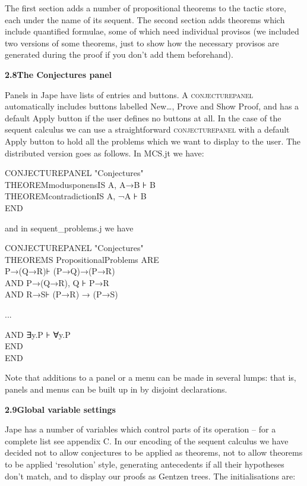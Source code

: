 \documentclass[11pt]{book}
\newcommand{\tab}{\hspace{5mm}}
\begin{document}
The first section adds a number of propositional theorems to the tactic store, each under the name of its sequent. The second section adds theorems which include quantified formulae, some of which need individual provisos (we included two versions of some theorems, just to show how the necessary provisos are generated during the proof if you don't add them beforehand).


\textbf{{\large 2.8\tab The Conjectures panel}}


Panels in Jape have lists of entries and buttons. A \textsc{conjecturepanel} automatically includes buttons labelled New\dots, Prove and Show Proof, and has a default Apply button if the user defines no buttons at all. In the case of the sequent calculus we can use a straightforward \textsc{conjecturepanel} with a default Apply button to hold all the problems which we want to display to the user. The distributed version goes as follows. In MCS.jt we have:

CONJECTUREPANEL "Conjectures" \\
THEOREM\tab modusponens\tab IS A, A→B ⊦ B \\
THEOREM\tab contradiction\tab IS A, ¬A ⊦ B\\
END


and in sequent\_problems.j we have

CONJECTUREPANEL "Conjectures" \\
THEOREMS PropositionalProblems ARE \\
P→(Q→R)\tab ⊦ (P→Q)→(P→R) \\
AND P→(Q→R), Q \tab ⊦ P→R \\
AND R→S\tab ⊦ (P→R) → (P→S)

...

 AND ∃y.P \tab ⊦ ∀y.P \\
END\\
END


Note that additions to a panel or a menu can be made in several lumps: that is, panels and menus can be built up in by disjoint declarations.


\textbf{{\large 2.9\tab Global variable settings}}


Jape has a number of variables which control parts of its operation -- for a complete list see appendix C. In our encoding of the sequent calculus we have decided not to allow conjectures to be applied as theorems, not to allow theorems to be applied `resolution' style, generating antecedents if all their hypotheses don't match, and to display our proofs as Gentzen trees. The initialisations are:
\end{document}
